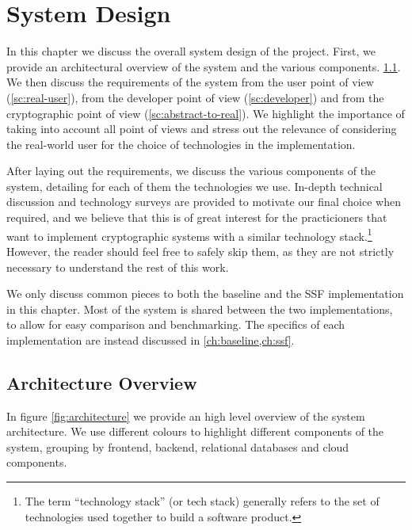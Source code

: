 \chapter{System Design}\label{ch:setup}

In this chapter we discuss the overall system design of the project.
First, we provide an architectural overview
of the system and the various components. \cref{sc:architectural-overview}.
We then discuss the requirements of the system from the user point of view
(\cref{sc:real-user}), from the developer point of view
(\cref{sc:developer}) and from the cryptographic point of view
(\cref{sc:abstract-to-real}). We highlight the importance
of taking into account all point of views and stress out the 
relevance of considering the real-world
user for the choice of technologies in the implementation. 

After laying out the requirements, we discuss the various
components of the system, detailing for each of them
the technologies we use. In-depth technical
discussion and technology surveys are provided
to motivate our final choice when required, and we believe
that this is of great interest for the practicioners
that want to implement cryptographic systems with 
a similar technology stack.\footnote{The term ``technology stack'' (or tech stack) generally refers to the set of technologies used together to build a software product.}
However, the reader should feel free to safely skip
them, as they are not strictly necessary to understand 
the rest of this work.

We only discuss common
pieces to both the baseline and the SSF implementation
in this chapter. Most of the system is
shared between the two implementations, to allow
for easy comparison and benchmarking.
The specifics of each implementation are instead discussed in \cref{ch:baseline,ch:ssf}.

\section{Architecture Overview}\label{sc:architectural-overview}

In figure \cref{fig:architecture} we provide an high level overview of the system architecture.
We use different colours to highlight different components of the system, grouping
by frontend, backend, relational databases and cloud components.

